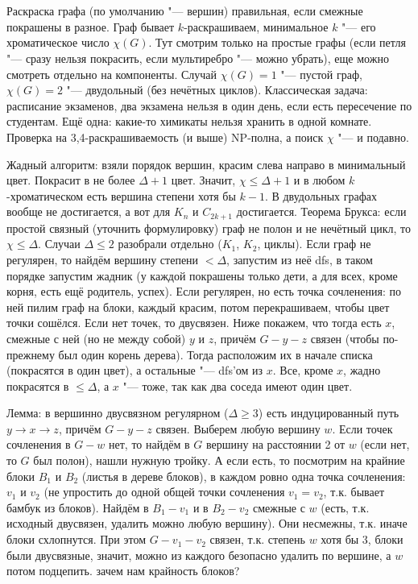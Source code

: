 \section{} %
	Раскраска графа (по умолчанию "--- вершин) правильная, если смежные покрашены в разное.
	Граф бывает $k$-раскрашиваем, минимальное $k$ "--- его хроматическое число $\chi(G)$.
	Тут смотрим только на простые графы (если петля "--- сразу нельзя покрасить, если мультиребро "--- можно убрать),
	еще можно смотреть отдельно на компоненты.
	Случай $\chi(G)=1$ "--- пустой граф, $\chi(G)=2$ "--- двудольный (без нечётных циклов).
	Классическая задача: расписание экзаменов, два экзамена нельзя в один день, если есть пересечение по студентам.
	Ещё одна: какие-то химикаты нельзя хранить в одной комнате.
	Проверка на 3,4-раскрашиваемость (и выше) NP-полна, а поиск $\chi$ "--- и подавно.

	Жадный алгоритм: взяли порядок вершин, красим слева направо в минимальный цвет.
	Покрасит в не более $\Delta+1$ цвет.
	Значит, $\chi\le\Delta+1$ и в любом $k$-хроматическом есть вершина степени хотя бы $k-1$.
	В двудольных графах вообще не достигается, а вот для $K_n$ и $C_{2k+1}$ достигается.
	Теорема Брукса: если простой связный (\TODO уточнить формулировку) граф не полон и не нечётный цикл, то $\chi \le \Delta$.
	Случаи $\Delta \le 2$ разобрали отдельно ($K_1$, $K_2$, циклы).
	Если граф не регулярен, то найдём вершину степени $<\Delta$, запустим из неё dfs, в таком порядке запустим жадник
	(у каждой покрашены только дети, а для всех, кроме корня, есть ещё родитель, успех).
	Если регулярен, но есть точка сочленения: по ней пилим граф на блоки, каждый красим, потом перекрашиваем, чтобы цвет точки сошёлся.
	Если нет точек, то двусвязен.
	Ниже покажем, что тогда есть $x$, смежные с ней (но не между собой) $y$ и $z$, причём $G-y-z$ связен (чтобы по-прежнему был один корень дерева).
	Тогда расположим их в начале списка (покрасятся в один цвет), а остальные "--- dfs'ом из $x$.
	Все, кроме $x$, жадно покрасятся в $\le \Delta$, а $x$ "--- тоже, так как два соседа имеют один цвет.
	
	Лемма: в вершинно двусвязном регулярном ($\Delta \ge 3$) есть индуцированный путь $y \to x \to z$, причём $G-y-z$ связен.
	Выберем любую вершину $w$.
	Если точек сочленения в $G-w$ нет, то найдём в $G$ вершину на расстоянии 2 от $w$ (если нет, то $G$ был полон), нашли нужную тройку.
	А если есть, то посмотрим на крайние блоки $B_1$ и $B_2$ (листья в дереве блоков), в каждом ровно одна точка сочленения: $v_1$ и $v_2$
	(не упростить до одной общей точки сочленения $v_1=v_2$, т.к. бывает бамбук из блоков).
	Найдём в $B_1-v_1$ и в $B_2-v_2$ смежные с $w$ (есть, т.к. исходный двусвязен, удалить можно любую вершину).
	Они несмежны, т.к. иначе блоки схлопнутся.
	При этом $G-v_1-v_2$ связен, т.к. степень $w$ хотя бы 3, блоки были двусвязные, значит, можно из каждого безопасно удалить по вершине,
	а $w$ потом подцепить.
	\TODO зачем нам крайность блоков?

